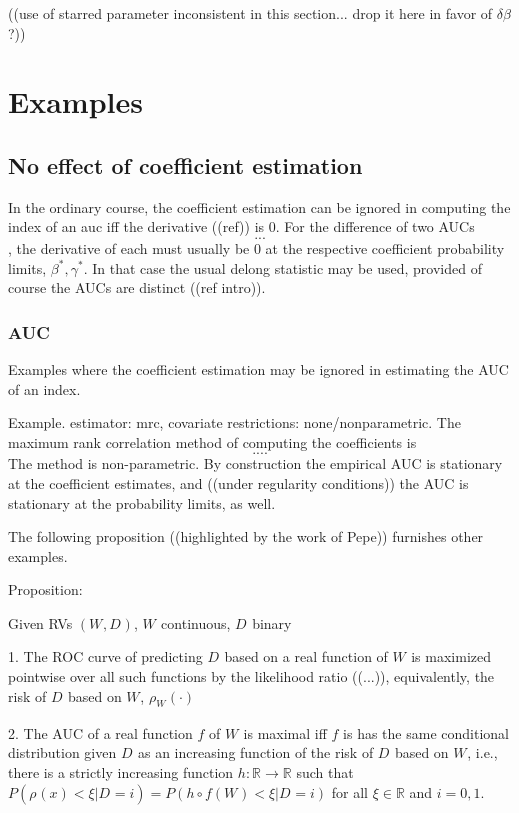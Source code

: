 \documentclass[12pt]{article}
\newcommand{\W}[1][]{W_{#1}}
\newcommand{\D}[1][]{D_{#1}}
\renewcommand{\star}[1]{{#1}^\ast}
\newcommand{\risk}[1][]{\rho_{#1}}
\theoremstyle{definition}
\begin{document}
((use of starred parameter inconsistent in this section... drop it
here in favor of $\delta\beta$ ?))

\section{Examples}

\subsection{No effect of coefficient estimation}
In the ordinary course, the coefficient estimation can be ignored in
computing the index of an auc iff the derivative ((ref)) is 0. For the
difference of two AUCs $$ ... $$, the derivative of each must usually be 0 at
the respective coefficient probability limits,
$\star\beta,\star\gamma$.  In that case the usual delong statistic
may be used, provided of course the AUCs are distinct ((ref intro)).


\subsubsection{AUC}

Examples where the coefficient estimation may be ignored in estimating the AUC of an index.

Example. estimator: mrc, covariate restrictions:
none/nonparametric. The maximum rank correlation method of computing
the coefficients is $$ ... .$$ The method is non-parametric. By
construction the empirical AUC is stationary at the coefficient
estimates, and ((under regularity conditions)) the AUC is stationary
at the probability limits, as well. 

The following proposition ((highlighted by the work of Pepe)) furnishes other examples.

Proposition:

Given RVs $(\W,\D)$, $\W$ continuous, $\D$ binary%
 
1. The ROC curve of predicting $\D$ based on a real function of $\W$
is maximized pointwise over all such functions by the likelihood ratio
((...)), equivalently, the risk of $\D$ based on $\W$, $\risk[{\W}](\cdot)$

2. The AUC of a real function $f$ of $\W$ is maximal iff $f$ is
has the same conditional distribution given $\D$ as an increasing function of the risk of $\D$ based on $\W$, i.e., there is a strictly
increasing function $h:\mathbb{R}\to\mathbb{R}$ such that
$P(\risk(x)<\xi|\D=i)=P(h\circ f(\W)<\xi|\D=i)$ for all $\xi\in\mathbb{R}$ and
$i=0,1$.
\end{document}
